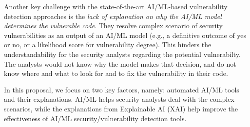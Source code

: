 
Another key challenge with the state-of-the-art AI/ML-based
vulnerability detection approaches is the {\em lack of explanation on
why the AI/ML model determines the vulnerable code}. They resolve
complex scenario of security vulnerabilities as an output of an AI/ML
model (e.g., a definitive outcome of yes or no, or a likelihood score
for vulnerability degree). This hinders the understandability for the
security analysts regarding the potential vulnerabilty. The analysts
would not know why the model makes that decision, and do not know
where and what to look for and to fix the vulnerability in their code.

In this proposal, we focus on two key factors, namely: automated AI/ML
tools and their explanations. AI/ML helps security analysts deal with
the complex scenarios, while the explanations from Explainable AI
(XAI) help improve the effectiveness of AI/ML security/vulnerability
detection tools.





